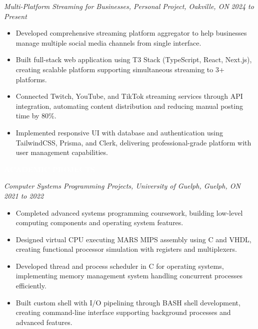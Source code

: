\documentclass[9pt]{src/developercv}
\begin{document}
  \vspace{1.0\baselineskip}
  
  \textit{Multi-Platform Streaming for Businesses, Personal Project, Oakville,
  ON} \hfill \textit{2024 to Present}
  \begin{itemize}[leftmargin=2em, itemsep=0.1em]
    \item Developed comprehensive streaming platform aggregator to help
    businesses manage multiple social media channels from single interface.
    \item Built full-stack web application using T3 Stack (TypeScript, React,
    Next.js), creating scalable platform supporting simultaneous streaming to 3+
    platforms.
    \item Connected Twitch, YouTube, and TikTok streaming services through API
    integration, automating content distribution and reducing manual posting
    time by 80\%.
    \item Implemented responsive UI with database and authentication using
    TailwindCSS, Prisma, and Clerk, delivering professional-grade platform with
    user management capabilities.
  \end{itemize}

  \vspace{\baselineskip}
  \colorbox{sky700}{\textcolor{white}{\LARGE\MakeUppercase{\textbf{Academic Projects}}}}

  \vspace{1.0\baselineskip}
  
  \textit{Computer Systems Programming Projects, University of Guelph, Guelph,
  ON} \hfill \textit{2021 to 2022}
  \begin{itemize}[leftmargin=2em, itemsep=0.1em]
    \item Completed advanced systems programming coursework, building low-level
    computing components and operating system features.
    \item Designed virtual CPU executing MARS MIPS assembly using C and VHDL,
    creating functional processor simulation with registers and multiplexers.
    \item Developed thread and process scheduler in C for operating systems,
    implementing memory management system handling concurrent processes
    efficiently.
    \item Built custom shell with I/O pipelining through BASH shell development,
    creating command-line interface supporting background processes and advanced
    features.
  \end{itemize}
\end{document}

